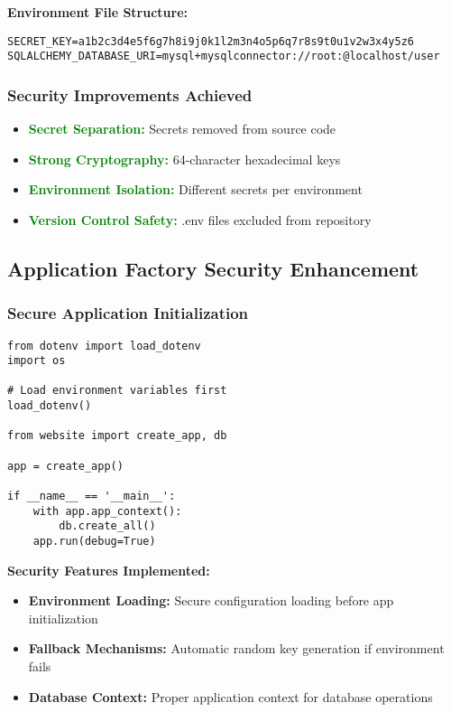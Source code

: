 \documentclass[12pt,a4paper]{article}
\begin{document}
\textbf{Environment File Structure:}
\begin{lstlisting}[caption=.env Configuration File]
SECRET_KEY=a1b2c3d4e5f6g7h8i9j0k1l2m3n4o5p6q7r8s9t0u1v2w3x4y5z6
SQLALCHEMY_DATABASE_URI=mysql+mysqlconnector://root:@localhost/user
\end{lstlisting}

\subsubsection{Security Improvements Achieved}

\begin{itemize}
    \item \textcolor{green}{\textbf{Secret Separation:}} Secrets removed from source code
    \item \textcolor{green}{\textbf{Strong Cryptography:}} 64-character hexadecimal keys
    \item \textcolor{green}{\textbf{Environment Isolation:}} Different secrets per environment
    \item \textcolor{green}{\textbf{Version Control Safety:}} .env files excluded from repository
\end{itemize}

\subsection{Application Factory Security Enhancement}

\subsubsection{Secure Application Initialization}
\begin{lstlisting}[caption=Enhanced Application Factory]
from dotenv import load_dotenv
import os

# Load environment variables first
load_dotenv()

from website import create_app, db

app = create_app()

if __name__ == '__main__':
    with app.app_context():
        db.create_all()
    app.run(debug=True)
\end{lstlisting}

\textbf{Security Features Implemented:}
\begin{itemize}
    \item \textbf{Environment Loading:} Secure configuration loading before app initialization
    \item \textbf{Fallback Mechanisms:} Automatic random key generation if environment fails
    \item \textbf{Database Context:} Proper application context for database operations
\end{itemize}
\end{document}
